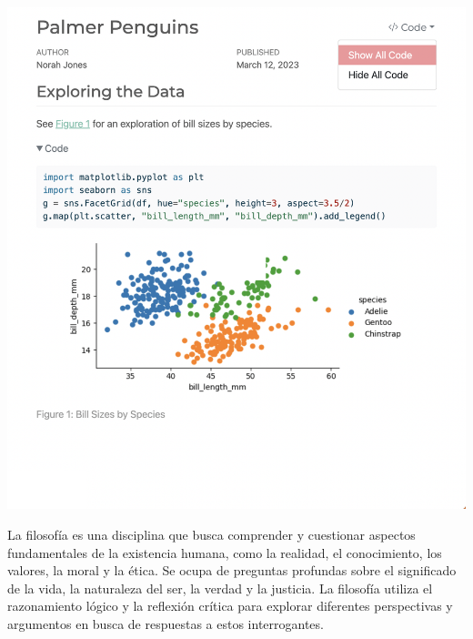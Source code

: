 \documentclass[
  letterpaper,
]{article}
\begin{document}
\includegraphics{images/demo-jupyter-output.png}

\leavevmode{}%
La filosofía es una disciplina que busca comprender y cuestionar
aspectos fundamentales de la existencia humana, como la realidad, el
conocimiento, los valores, la moral y la ética. Se ocupa de preguntas
profundas sobre el significado de la vida, la naturaleza del ser, la
verdad y la justicia. La filosofía utiliza el razonamiento lógico y la
reflexión crítica para explorar diferentes perspectivas y argumentos en
busca de respuestas a estos interrogantes.
\end{document}
